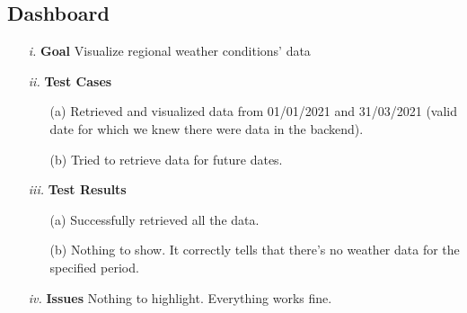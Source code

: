 \documentclass[table, 12pt]{article}
\begin{document}
\subsection{Dashboard}
\begin{itemize}
    \item[\textit{i.}] \textbf{Goal} Visualize regional weather conditions' data
    \item[\textit{ii.}] \textbf{Test Cases}
    \begin{itemize}
        \item[(a)] Retrieved and visualized data from 01/01/2021 and 31/03/2021 (valid date for which we knew there were data in the backend).
        \item[(b)] Tried to retrieve data for future dates.
    \end{itemize}
    \item[\textit{iii.}] \textbf{Test Results}
    \begin{itemize}
        \item[(a)] Successfully retrieved all the data.
        \item[(b)] Nothing to show. It correctly tells that there's no weather data for the specified period.  
    \end{itemize} 
    \item[\textit{iv.}] \textbf{Issues}  Nothing to highlight. Everything works fine. 
\end{itemize}
\end{document}
